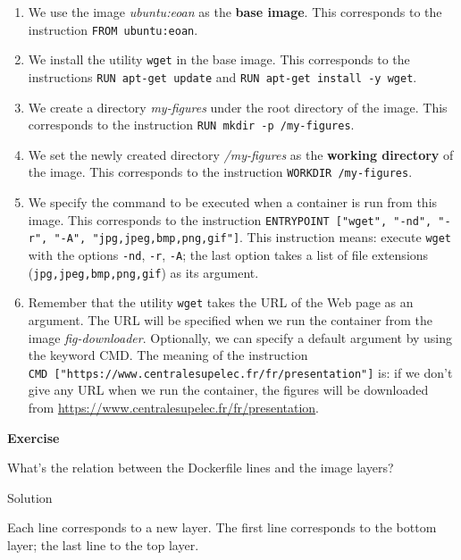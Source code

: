 \documentclass[
]{article}
\newenvironment{infobox}[1]
  {
  \begin{itemize}
  \renewcommand{\labelitemi}{
    \raisebox{-.7\height}[0pt][0pt]{
      
    }
  }
  \setlength{\fboxsep}{1em}
  \begin{whitebox}
  \item
  }
  {
  \end{whitebox}
  \end{itemize}
  }
\theoremstyle{definition}
\theoremstyle{definition}
\theoremstyle{definition}
\theoremstyle{remark}
\let\BeginKnitrBlock\begin \let\EndKnitrBlock\end
\begin{document}
\begin{enumerate}
\def\labelenumi{\arabic{enumi}.}
\item
  We use the image \emph{ubuntu:eoan} as the \textbf{base image}.
  This corresponds to the instruction \texttt{FROM\ ubuntu:eoan}.
\item
  We install the utility \texttt{wget} in the base image.
  This corresponds to the
  instructions \texttt{RUN\ apt-get\ update} and \texttt{RUN\ apt-get\ install\ -y\ wget}.
\item
  We create a directory \emph{my-figures} under the root directory of the image.
  This corresponds to the instruction \texttt{RUN\ mkdir\ -p\ /my-figures}.
\item
  We set the newly created directory \emph{/my-figures} as the
  \textbf{working directory} of the image. This corresponds to the
  instruction \texttt{WORKDIR\ /my-figures}.
\item
  We specify the command to be executed when a container is run from this image.
  This corresponds to the instruction \texttt{ENTRYPOINT\ {[}"wget",\ "-nd",\ "-r",\ "-A",\ "jpg,jpeg,bmp,png,gif"{]}}.
  This instruction means: execute \texttt{wget} with the options
  \texttt{-nd}, \texttt{-r}, \texttt{-A};
  the last option takes a list of file
  extensions (\texttt{jpg,jpeg,bmp,png,gif}) as its argument.
\item
  Remember that the utility \texttt{wget} takes the URL of the Web page as
  an argument. The URL will be specified when we run the container from
  the image \emph{fig-downloader}.
  Optionally, we can specify a default argument by using the
  keyword CMD. The meaning of the instruction
  \texttt{CMD\ {[}"https://www.centralesupelec.fr/fr/presentation"{]}} is:
  if we don't give any URL when we run the container, the figures will
  be downloaded from
  \url{https://www.centralesupelec.fr/fr/presentation}.
\end{enumerate}

\begin{infobox}{exercisebox}

\textbf{Exercise}

\BeginKnitrBlock{exercise}
\protect\hypertarget{exr:unnamed-chunk-15}{}{\label{exr:unnamed-chunk-15} }What's the relation between the Dockerfile lines and the image layers?
\EndKnitrBlock{exercise}

\end{infobox}

Solution

\begin{infobox}{exercisebox}

Each line corresponds to a new layer.
The first line corresponds to the bottom layer;
the last line to the top layer.

\end{infobox}
\end{document}
